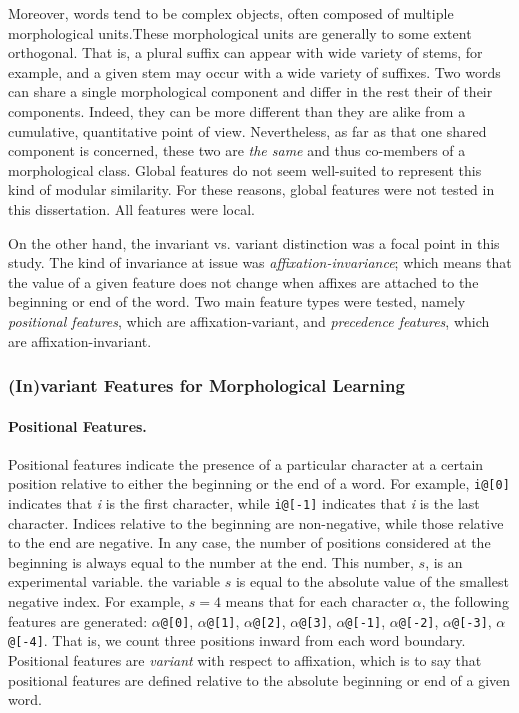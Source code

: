 Moreover, words tend to be complex objects, often composed of 
multiple morphological units.These morphological units are 
generally to some extent orthogonal. That is, a plural suffix can 
appear with wide variety of stems, for example, and a 
given stem may occur with a wide variety of suffixes.
Two words can share a single morphological component and 
differ in the rest their of their components. Indeed,
they can be more different than they are alike from a cumulative, 
quantitative point of view. Nevertheless,
as far as that one shared component is concerned, these two are 
\emph{the same} and thus co-members of a morphological
class. Global features do not seem well-suited to represent this 
kind of modular similarity. For these reasons, global features were 
not tested in this dissertation. All features were local. 

On the other hand, the invariant vs. variant distinction 
was a focal point in this study.
The kind of invariance at issue was \emph{affixation-invariance}; 
which means that the value of a given feature does not change
when affixes are attached to the beginning or end of the word. 
Two main feature types were tested, namely 
\emph{positional features}, which are affixation-variant, 
and \emph{precedence features}, which are affixation-invariant.

\subsubsection{(In)variant Features for Morphological Learning}
\paragraph{Positional Features.}
Positional features
indicate the presence of a particular
character at a certain position relative to either the beginning or the end of 
a word. For example, \texttt{i@[0]} indicates that \textit{i} is the first 
character, while \texttt{i@[-1]} indicates that \textit{i} is the last character. 
Indices relative to the beginning are non-negative, while those relative 
to the end are negative. In any case, the number of positions considered 
at the beginning is always equal to the number at the end. This number, 
$s$, is an experimental variable.
the variable $s$ is equal to the absolute value of the smallest negative index. 
For example, $s=4$ means that for each character $\alpha$, the following 
features are generated: $\alpha$\texttt{@[0]}, $\alpha$\texttt{@[1]}, 
$\alpha$\texttt{@[2]}, $\alpha$\texttt{@[3]}, $\alpha$\texttt{@[-1]}, $\alpha$\texttt{@[-2]}, 
$\alpha$\texttt{@[-3]}, $\alpha$\texttt{@[-4]}.
That is, we count three positions inward from each word boundary.
Positional features are \emph{variant} 
with respect to affixation, which is to say that positional features are 
defined relative to the absolute beginning 
or end of a given word. 

